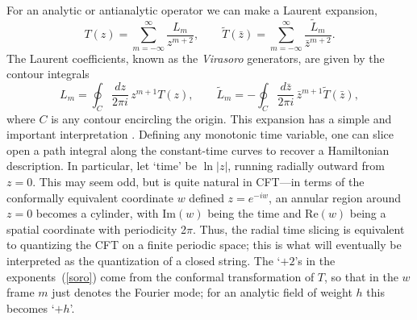 For an analytic or antianalytic operator we can make a Laurent
expansion,
\begin{equation}
T(z) = \sum_{m=-\infty}^{\infty} \frac{ L_{m} }{z^{m+2}}, \qquad
\tilde T(\bar z) = \sum_{m=-\infty}^{\infty} \frac{ \tilde{L}_{m}
}{\bar z^{m+2}}. 
\label{soro}
\end{equation}
The Laurent coefficients, known as the {\it Virasoro} generators,
are given by the contour integrals
\begin{equation}
L_m = \oint_C \frac{dz}{2\pi i }\, z^{m+1} T(z), \qquad
\tilde{L}_m = -\oint_C \frac{d\bar z}{2\pi i }\, \bar z^{m+1}
\tilde T(\bar z), \label{cont}
\end{equation}
where $C$ is any contour encircling the origin.  This expansion
has a simple and important interpretation \cite{FHZ}.
Defining any monotonic
time variable, one can slice open a path integral along the
constant-time curves to recover a Hamiltonian description.  In
particular, let `time' be $\ln |z|$, running radially outward from
$z=0$.  This may seem odd, but is quite natural in CFT---in terms
of the conformally equivalent coordinate $w$ defined $z = e^{-iw}$,
an annular region around $z=0$ becomes a cylinder, with Im$(w)$
being the time and Re$(w)$ being a spatial coordinate with
periodicity 2$\pi$.  Thus, the radial time slicing is equivalent
to quantizing the CFT on a finite periodic space; this is what
will eventually be interpreted as the quantization of a closed
string.  The `$+2$'s in the exponents~(\ref{soro}) come from the
conformal transformation of $T$, so that in the $w$ frame $m$ just
denotes the Fourier mode; for an analytic field of weight $h$ this
becomes `$+h$'.

